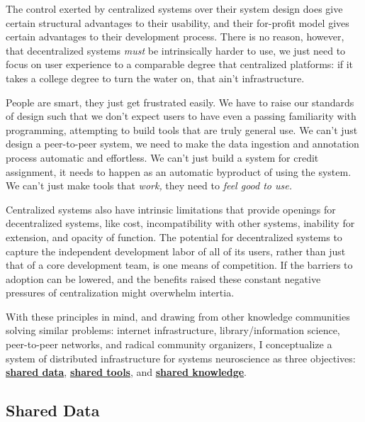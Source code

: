 \documentclass[11pt]{article}
\begin{document}
\begin{multicols}{2}
The control exerted by centralized systems over their system design does
give certain structural advantages to their usability, and their
for-profit model gives certain advantages to their development process.
There is no reason, however, that decentralized systems \emph{must} be
intrinsically harder to use, we just need to focus on user experience to
a comparable degree that centralized platforms: if it takes a college
degree to turn the water on, that ain't infrastructure.

People are smart, they just get frustrated easily. We have to raise our
standards of design such that we don't expect users to have even a
passing familiarity with programming, attempting to build tools that are
truly general use. We can't just design a peer-to-peer system, we need
to make the data ingestion and annotation process automatic and
effortless. We can't just build a system for credit assignment, it needs
to happen as an automatic byproduct of using the system. We can't just
make tools that \emph{work,} they need to \emph{feel good to use.}

Centralized systems also have intrinsic limitations that provide
openings for decentralized systems, like cost, incompatibility with
other systems, inability for extension, and opacity of function. The
potential for decentralized systems to capture the independent
development labor of all of its users, rather than just that of a core
development team, is one means of competition. If the barriers to
adoption can be lowered, and the benefits raised these constant negative
pressures of centralization might overwhelm intertia.

With these principles in mind, and drawing from other knowledge
communities solving similar problems: internet infrastructure,
library/information science, peer-to-peer networks, and radical
community organizers, I conceptualize a system of distributed
infrastructure for systems neuroscience as three objectives:
\protect\hyperlink{shared-data}{\textbf{shared data}},
\protect\hyperlink{shared-tools}{\textbf{shared tools}}, and
\protect\hyperlink{shared-knowledge}{\textbf{shared knowledge}}.

\end{multicols}


\hypertarget{shared-data}{%
\subsection{Shared Data}\label{shared-data}}
\end{document}
